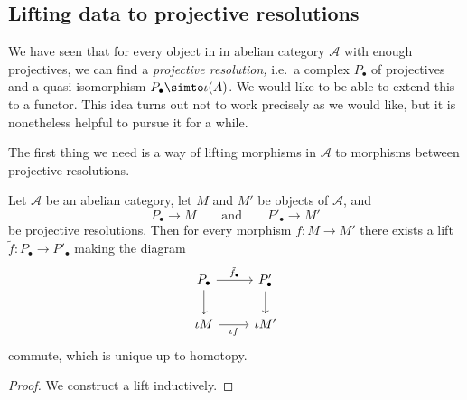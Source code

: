 \documentclass[main.tex]{subfiles}
\begin{document}
\subsection{Lifting data to projective resolutions}
\label{ssc:lifting_data_to_projective_resolutions}

We have seen that for every object in in abelian category $\mathcal{A}$ with enough projectives, we can find a \emph{projective resolution,} i.e.\ a complex $P_{\bullet}$ of projectives and a quasi-isomorphism $P_{\bullet} \simto \iota(A)$. We would like to be able to extend this to a functor. This idea turns out not to work precisely as we would like, but it is nonetheless helpful to pursue it for a while.

The first thing we need is a way of lifting morphisms in $\mathcal{A}$ to morphisms between projective resolutions.

\begin{proposition}
  \label{prop:can_lift_morphisms_to_projective_resolutions}
  Let $\mathcal{A}$ be an abelian category, let $M$ and $M'$ be objects of $\mathcal{A}$, and
  \begin{equation*}
    P_{\bullet} \to M \qquad\text{and}\qquad P'_{\bullet} \to M'
  \end{equation*}
  be projective resolutions. Then for every morphism $f\colon M \to M'$ there exists a lift $\tilde{f}\colon P_{\bullet} \to P'_{\bullet}$ making the diagram
  \begin{equation*}
    \begin{tikzcd}
      P_{\bullet}
      \arrow[r, "\tilde{f}_{\bullet}"]
      \arrow[d]
      & P'_{\bullet}
      \arrow[d]
      \\
      \iota M
      \arrow[r, swap, "\iota f"]
      & \iota M'
    \end{tikzcd}
  \end{equation*}
  commute, which is unique up to homotopy.
\end{proposition}
\begin{proof}
  We construct a lift inductively.
\end{proof}
\end{document}
